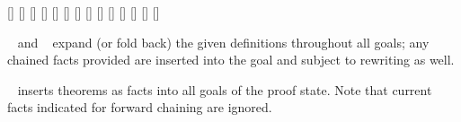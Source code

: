 \begin{isabellebody}
\begin{isamarkuptext}
  \begin{railoutput}
\rail@bar
{}[]
[]
[]
\rail@endbar
{}[]
\rail@end
{}
\rail@bar
{}[]
[]
[]
\rail@endbar
\rail@bar
{}
[]
[]
[]
\rail@endbar
{}[]
\rail@end
{}
\rail@bar
{}[]
[]
\rail@endbar
\rail@bar
{}
[]
\rail@endbar
\rail@end
\end{railoutput}


  \begin{description}
  
  \item \hyperlink{method.unfold}{\mbox{}}~ and \hyperlink{method.fold}{\mbox{}}~ expand (or fold back) the given definitions throughout
  all goals; any chained facts provided are inserted into the goal and
  subject to rewriting as well.

  \item \hyperlink{method.insert}{\mbox{}}~ inserts theorems as facts
  into all goals of the proof state.  Note that current facts
  indicated for forward chaining are ignored.


\end{description}
\end{isamarkuptext}
\end{isabellebody}
